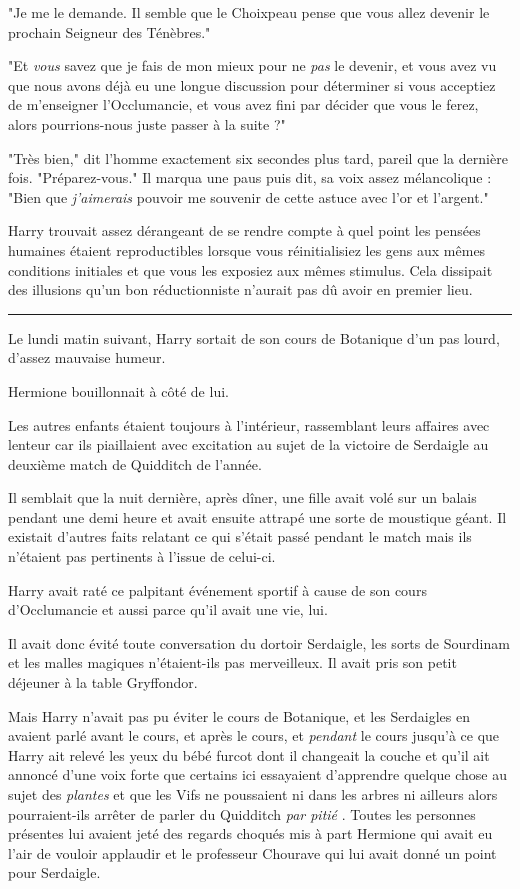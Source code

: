 "Je me le demande. Il semble que le Choixpeau pense que vous allez devenir le prochain Seigneur des Ténèbres."

"Et \emph{vous}  savez que je fais de mon mieux pour ne \emph{pas}  le devenir, et vous avez vu que nous avons déjà eu une longue discussion pour déterminer si vous acceptiez de m'enseigner l'Occlumancie, et vous avez fini par décider que vous le ferez, alors pourrions-nous juste passer à la suite ?"

"Très bien," dit l'homme exactement six secondes plus tard, pareil que la dernière fois. "Préparez-vous." Il marqua une paus puis dit, sa voix assez mélancolique : "Bien que \emph{j'aimerais}  pouvoir me souvenir de cette astuce avec l'or et l'argent."

Harry trouvait assez dérangeant de se rendre compte à quel point les pensées humaines étaient reproductibles lorsque vous réinitialisiez les gens aux mêmes conditions initiales et que vous les exposiez aux mêmes stimulus. Cela dissipait des illusions qu'un bon réductionniste n'aurait pas dû avoir en premier lieu.
\par\noindent\rule{\textwidth}{0.4pt}
Le lundi matin suivant, Harry sortait de son cours de Botanique d'un pas lourd, d'assez mauvaise humeur.

Hermione bouillonnait à côté de lui.

Les autres enfants étaient toujours à l'intérieur, rassemblant leurs affaires avec lenteur car ils piaillaient avec excitation au sujet de la victoire de Serdaigle au deuxième match de Quidditch de l'année.

Il semblait que la nuit dernière, après dîner, une fille avait volé sur un balais pendant une demi heure et avait ensuite attrapé une sorte de moustique géant. Il existait d'autres faits relatant ce qui s'était passé pendant le match mais ils n'étaient pas pertinents à l'issue de celui-ci.

Harry avait raté ce palpitant événement sportif à cause de son cours d'Occlumancie et aussi parce qu'il avait une vie, lui.

Il avait donc évité toute conversation du dortoir Serdaigle, les sorts de Sourdinam et les malles magiques n'étaient-ils pas merveilleux. Il avait pris son petit déjeuner à la table Gryffondor.

Mais Harry n'avait pas pu éviter le cours de Botanique, et les Serdaigles en avaient parlé avant le cours, et après le cours, et \emph{pendant}  le cours jusqu'à ce que Harry ait relevé les yeux du bébé furcot dont il changeait la couche et qu'il ait annoncé d'une voix forte que certains ici essayaient d'apprendre quelque chose au sujet des \emph{plantes}  et que les Vifs ne poussaient ni dans les arbres ni ailleurs alors pourraient-ils arrêter de parler du Quidditch \emph{par pitié} . Toutes les personnes présentes lui avaient jeté des regards choqués mis à part Hermione qui avait eu l'air de vouloir applaudir et le professeur Chourave qui lui avait donné un point pour Serdaigle.

